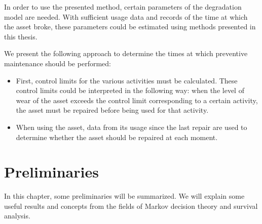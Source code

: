 In order to use the presented method, certain parameters of the degradation model are needed.
With sufficient usage data and records of the time at which the asset broke, these parameters could be estimated using methods presented in this thesis.

We present the following approach to determine the times at which preventive maintenance should be performed:
\begin{itemize}
	\item First, control limits for the various activities must be calculated.
	These control limits could be interpreted in the following way:
	when the level of wear of the asset exceeds the control limit corresponding to a certain activity, the asset must be repaired before being used for that activity.
	\item When using the asset, data from its usage since the last repair are used to determine whether the asset should be repaired at each moment.
\end{itemize}







\tableofcontents

\mainmatter



\chapter{Preliminaries}\label{chapter:literatureOverview}
In this chapter, some preliminaries will be summarized.
We will explain some useful results and concepts from the fields of Markov decision theory and survival analysis.

